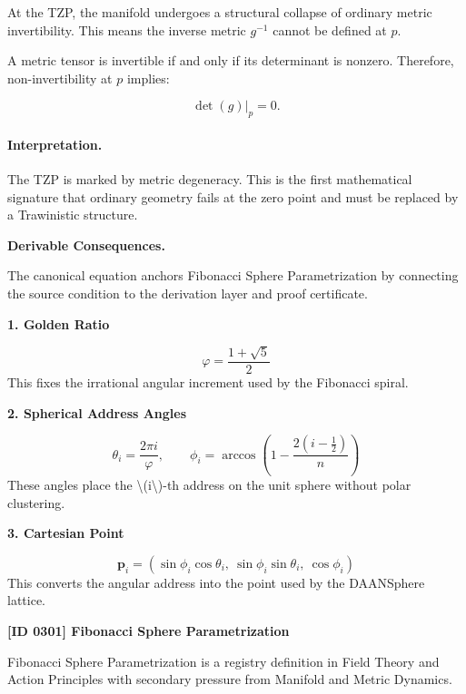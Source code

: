 At the TZP, the manifold undergoes a structural collapse of ordinary metric invertibility. This means the inverse metric $g^{-1}$ cannot be defined at $p$.

A metric tensor is invertible if and only if its determinant is nonzero. Therefore, non-invertibility at $p$ implies:

\begin{equation}
\det(g)\big|_{p}=0 .
\end{equation}

\paragraph{Interpretation.}
The TZP is marked by metric degeneracy. This is the first mathematical signature that ordinary geometry fails at the zero point and must be replaced by a Trawinistic structure.

\par\vspace{0.35em}
\noindent\textbf{Derivable Consequences.}\quad
\begingroup
\footnotesize
\raggedright
The canonical equation anchors Fibonacci Sphere Parametrization by connecting the source condition to the derivation layer and proof certificate.
\par\endgroup

\noindent\textbf{1. Golden Ratio}\par
\[
\varphi = \frac{1+\sqrt{5}}{2}
\]
\noindent This fixes the irrational angular increment used by the Fibonacci spiral.\par
\noindent\textbf{2. Spherical Address Angles}\par
\[
\theta_i = \frac{2\pi i}{\varphi},
\qquad
\phi_i = \arccos\!\left(1-\frac{2(i-\tfrac{1}{2})}{n}\right)
\]
\noindent These angles place the \textbackslash{}(i\textbackslash{})-th address on the unit sphere without polar clustering.\par
\noindent\textbf{3. Cartesian Point}\par
\[
\mathbf{p}_i =
(\sin\phi_i\cos\theta_i,\ \sin\phi_i\sin\theta_i,\ \cos\phi_i)
\]
\noindent This converts the angular address into the point used by the DAANSphere lattice.\par

\clearpage
\noindent\textbf{[ID 0301] Fibonacci Sphere Parametrization}\par
\vspace{0.35em}
\begingroup\small
{}
Fibonacci Sphere Parametrization is a registry definition in Field Theory and Action Principles with secondary pressure from Manifold and Metric Dynamics.

